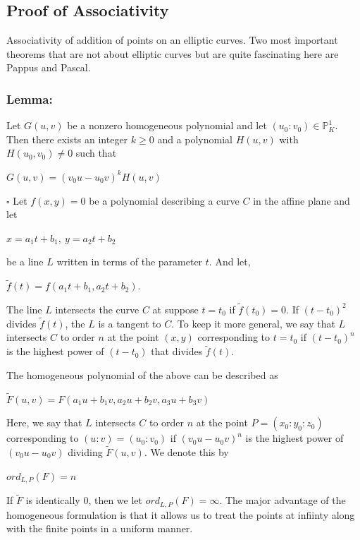 \documentclass[a4paper, 12pt]{article}
\begin{document}
\subsection {Proof of Associativity}
Associativity of addition of points on an elliptic curves. Two most important theorems that are not about elliptic curves but are quite fascinating here are Pappus and Pascal.\par
\subsubsection{Lemma:}  
Let $G(u,v)$ be a nonzero homogeneous polynomial and let $(u_0:v_0)\in \mathbb{P}_K^1$. Then there exists an integer $k \geq 0$ and a polynomial $H(u,v)$ with $H(u_0,v_0) \neq 0$ such that
\begin{center} $G(u,v)=(v_0u-u_0v)^kH(u,v)$\end{center}\par
$\square$\newline
Let $f(x,y)=0$ be a polynomial describing a curve $C$ in the affine plane and let
\begin{center} $x=a_1t+b_1,\: y=a_2t+b_2$ \end{center}
be a line $L$ written in terms of the parameter $t$. And let,
\begin{center} $\tilde{f}(t) = f(a_1t+b_1,a_2t+b_2).$ \end{center}
The line $L$ intersects the curve $C$ at suppose $t=t_0$ if $\tilde{f}(t_0)=0$. If $(t-t_0)^2$ divides $\tilde{f}(t)$, the $L$ is a tangent to $C$. To keep it more general, we say that $L$ intersects $C$ to order $n$ at the point $(x,y)$ corresponding to $t=t_0$ if $(t-t_0)^n$ is the highest power of $(t-t_0)$ that divides $\tilde{f}(t)$.\par
The homogeneous polynomial of the above can be described as 
\begin{center}
$\tilde{F}(u,v) = F(a_1u+b_1v,a_2u+b_2v,a_3u+b_3v)$
\end{center}
Here, we say that $L$ intersects $C$ to order $n$ at the point $P = (x_0:y_0:z_0)$ corresponding to $(u:v) = (u_0:v_0)$ if $(v_0u-u_0v)^n$ is the highest power of $(v_0u-u_0v)$ dividing $\tilde{F}(u,v)$. We denote this by
\begin{center} $ord_{L,P}(F) = n$ \end{center}
If $\tilde{F}$ is identically 0, then we let $ord_{L,P}(F) = \infty$. The major advantage of the homogeneous formulation is that it allows us to treat the points at infiinty along with the finite points in a uniform manner.\par
\end{document}
